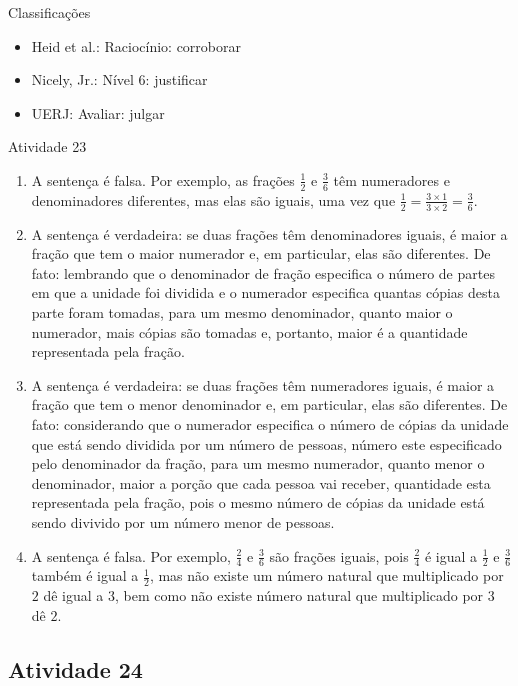 \begin{multicols}{2}
Classificações
\begin{itemize} %
  \item Heid et al.: Raciocínio: corroborar
  \item Nicely, Jr.: Nível 6: justificar
  \item UERJ: Avaliar: julgar
\end{itemize}


\begin{resposta*}{Atividade 23}
\begin{enumerate} [\quad a)] %
    \item A sentença é falsa. Por exemplo, as frações $\frac{1}{2}$ e 
$\frac{3}{6}$ têm numeradores e denominadores diferentes, mas elas são iguais, 
uma vez que $\frac{1}{2} = \frac{3 \times 1}{3 \times 2} = \frac{3}{6}$.
    \item A sentença é verdadeira: se duas frações têm denominadores iguais, é 
maior a fração que tem o maior numerador e, em particular, elas são diferentes. 
De fato: lembrando que o denominador de fração especifica o número de partes em 
que a unidade foi dividida e o numerador especifica quantas cópias desta parte 
foram tomadas, para um mesmo denominador, quanto maior o numerador, mais cópias 
são tomadas e, portanto, maior é a quantidade representada pela fração.
    \item  A sentença é verdadeira: se duas frações têm numeradores iguais, é 
maior a fração que tem o menor denominador e, em particular, elas são 
diferentes. De fato: considerando que o numerador especifica o número de cópias 
da unidade que está sendo dividida por um número de pessoas, número este 
especificado pelo denominador da fração, para um mesmo numerador, quanto menor o 
denominador, maior a porção que cada pessoa vai receber, quantidade esta 
representada pela fração, pois o mesmo número de cópias da unidade está sendo 
divivido por um número menor de pessoas.
    \item A sentença é falsa. Por exemplo, $\frac{2}{4}$ e $\frac{3}{6}$ são 
frações iguais, pois $\frac{2}{4}$ é igual a $\frac{1}{2}$ e $\frac{3}{6}$ 
também é igual a $\frac{1}{2}$, mas não existe um número natural que 
multiplicado por $2$ dê igual a $3$, bem como não existe número natural que 
multiplicado por $3$ dê $2$.
\end{enumerate}
\end{resposta*}

\subsection{Atividade 24}


\end{multicols}
